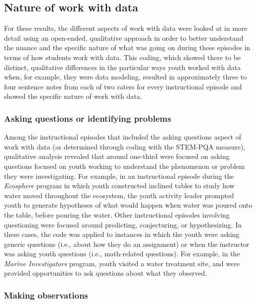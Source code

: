 \documentclass[]{book}
\theoremstyle{definition}
\theoremstyle{definition}
\theoremstyle{definition}
\theoremstyle{remark}
\begin{document}
\subsection{Nature of work with data}\label{nature-of-work-with-data}

For these results, the different aspects of work with data were looked
at in more detail using an open-ended, qualitative approach in order to
better understand the nuance and the specific nature of what was going
on during these episodes in terms of how students work with data. This
coding, which showed there to be distinct, qualitative differences in
the particular ways youth worked with data when, for example, they were
data modeling, resulted in approximately three to four sentence notes
from each of two raters for every instructional episode and showed the
specific nature of work with data.

\subsubsection{Asking questions or identifying
problems}\label{asking-questions-or-identifying-problems}

Among the instructional episodes that included the asking questions
aspect of work with data (as determined through coding with the STEM-PQA
measure), qualitative analysis revealed that around one-third were
focused on asking questions focused on youth working to understand the
phenomenon or problem they were investigating. For example, in an
instructional episode during the \emph{Ecosphere} program in which youth
constructed inclined tables to study how water moved throughout the
ecosystem, the youth activity leader prompted youth to generate
hypotheses of what would happen when water was poured onto the table,
before pouring the water. Other instructional episodes involving
questioning were focused around predicting, conjecturing, or
hypothesizing. In these cases, the code was applied to instances in
which the youth were asking generic questions (i.e., about how they do
an assignment) or when the instructor was asking youth questions (i.e.,
math-related questions). For example, in the \emph{Marine Investigators}
program, youth visited a water treatment site, and were provided
opportunities to ask questions about what they observed.

\subsubsection{Making observations}\label{making-observations}
\end{document}
